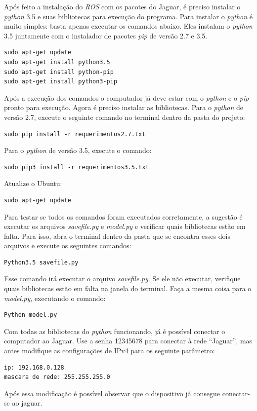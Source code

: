 Após feito a instalação do \textit{ROS} com os pacotes do Jaguar, é preciso instalar o \textit{python} 3.5 e suas bibliotecas para execução do programa. Para instalar o \textit{python} é muito simples: basta apenas executar os comandos abaixo. Eles instalam o \textit{python} 3.5 juntamente com o instalador de pacotes \textit{pip} de versão 2.7 e 3.5.
\begin{lstlisting}
sudo apt-get update
sudo apt-get install python3.5
sudo apt-get install python-pip 
sudo apt-get install python3-pip
\end{lstlisting}
Após a execução dos comandos o computador já deve estar com o \textit{python} e o \textit{pip} pronto para execução. Agora é preciso instalar as bibliotecas. Para o \textit{python} de versão 2.7, execute o seguinte comando no terminal dentro da pasta do projeto: 
\begin{lstlisting}
sudo pip install -r requerimentos2.7.txt
\end{lstlisting}
Para o \textit{python} de versão 3.5, execute o comando:
\begin{lstlisting}
sudo pip3 install -r requerimentos3.5.txt
\end{lstlisting}
Atualize o Ubuntu:
\begin{lstlisting}
sudo apt-get update
\end{lstlisting}
Para testar se todos os comandos foram executados corretamente, a sugestão é executar os arquivos \textit{savefile.py} e \textit{model.py} e verificar quais bibliotecas estão em falta. Para isso, abra o terminal dentro da pasta que se encontra esses dois arquivos e execute os seguintes comandos:
\begin{lstlisting}
Python3.5 savefile.py
\end{lstlisting}
Esse comando irá executar o arquivo \textit{savefile.py}. Se ele não executar, verifique quais bibliotecas estão em falta na janela do terminal. Faça a mesma coisa para o \textit{model.py}, executando o comando:
\begin{lstlisting}
Python model.py
\end{lstlisting}
Com todas as bibliotecas do \textit{python} funcionando, já é possível conectar o computador ao Jaguar. Use a senha 12345678 para conectar à rede “Jaguar”, mas antes modifique as configurações de IPv4 para os seguinte parâmetro:
\begin{lstlisting}
ip: 192.168.0.128
mascara de rede: 255.255.255.0
\end{lstlisting}
Após essa modificação é possível observar que o dispositivo já consegue conectar-se ao jaguar. 

